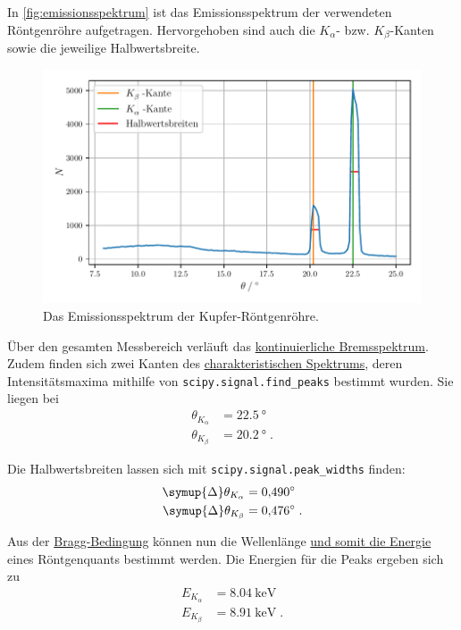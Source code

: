 In \autoref{fig:emissionsspektrum} ist das Emissionsspektrum der verwendeten Röntgenröhre aufgetragen.
Hervorgehoben sind auch die $K_\alpha$- bzw. $K_\beta$-Kanten
sowie die jeweilige Halbwertsbreite.

\begin{figure}
    \centering
    \includegraphics[width=\textwidth]{build/plot_emissionsspektrum.pdf}
    \caption{Das Emissionsspektrum der Kupfer-Röntgenröhre.}
    \label{fig:emissionsspektrum}
\end{figure}

Über den gesamten Messbereich verläuft das \hyperref[sec:theorie:bremsspektrum]{kontinuierliche Bremsspektrum}.
Zudem finden sich zwei Kanten des \hyperref[sec:theorie:char_spektrum]{charakteristischen Spektrums},
deren Intensitätsmaxima mithilfe von \texttt{scipy.signal.find\_peaks} bestimmt wurden.
Sie liegen bei
\begin{align*}
    \theta_{K_\alpha} &= \SI{22.5}{\degree} \\
    \theta_{K_\beta}  &= \SI{20.2}{\degree} \; .
\end{align*}


Die Halbwertsbreiten lassen sich mit \texttt{scipy.signal.peak\_widths} finden:
\begin{align*}
    \symup{\Delta}\theta_{K_\alpha} &= \SI{0.490}{\degree} \\
    \symup{\Delta}\theta_{K_\beta}  &= \SI{0.476}{\degree} \; .
\end{align*}


Aus der \hyperref[eqn:BraggBedingung]{Bragg-Bedingung} können nun
die Wellenlänge \hyperref[eqn:lambda_to_E]{und somit die Energie} eines Röntgenquants bestimmt werden.
Die Energien für die Peaks ergeben sich zu
\begin{align*}
    E_{K_\alpha} &=  \SI{8.04}{\kilo\electronvolt} \\
    E_{K_\beta}  &=  \SI{8.91}{\kilo\electronvolt} \; .
\end{align*}

